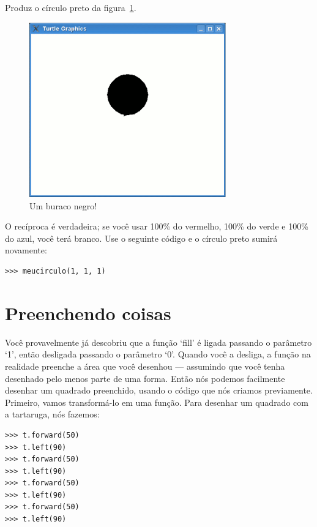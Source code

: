 {Produz o círculo preto da figura~\ref{fig25}.

\begin{figure}
\begin{center}
\includegraphics[width=85mm]{eps/figure25.eps}
\end{center}
\caption{Um buraco negro!}\label{fig25}
\end{figure}

O recíproca é verdadeira; se você usar 100\% do vermelho, 100\% do verde e 100\% do azul, você terá branco. Use o seguinte código e o círculo preto sumirá novamente:

\begin{listing}
\begin{verbatim}
>>> meucirculo(1, 1, 1)
\end{verbatim}
\end{listing}

\section{Preenchendo coisas}

Você provavelmente já descobriu que a função `fill' é ligada passando o parâmetro `1', então desligada passando o parâmetro `0'. Quando você a desliga, a função na realidade preenche a área que você desenhou --- assumindo que você tenha desenhado pelo menos parte de uma forma. Então nós podemos facilmente desenhar um quadrado preenchido, usando o código que nós criamos previamente. Primeiro, vamos transformá-lo em uma função. Para desenhar um quadrado com a tartaruga, nós fazemos:

\begin{listing}
\begin{verbatim}
>>> t.forward(50)
>>> t.left(90)
>>> t.forward(50)
>>> t.left(90)
>>> t.forward(50)
>>> t.left(90)
>>> t.forward(50)
>>> t.left(90)
\end{verbatim}
\end{listing}

}
